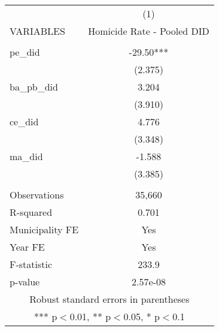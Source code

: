 \documentclass[]{article}
\begin{document}
\begin{tabular}{lc} \hline
 & (1) \\
VARIABLES & Homicide Rate - Pooled DID \\ \hline
 &  \\
pe\_did & -29.50*** \\
 & (2.375) \\
ba\_pb\_did & 3.204 \\
 & (3.910) \\
ce\_did & 4.776 \\
 & (3.348) \\
ma\_did & -1.588 \\
 & (3.385) \\
 &  \\
Observations & 35,660 \\
R-squared & 0.701 \\
Municipality FE & Yes \\
Year FE & Yes \\
F-statistic & 233.9 \\
 p-value & 2.57e-08 \\ \hline
\multicolumn{2}{c}{ Robust standard errors in parentheses} \\
\multicolumn{2}{c}{ *** p$<$0.01, ** p$<$0.05, * p$<$0.1} \\
\end{tabular}
\end{document}

